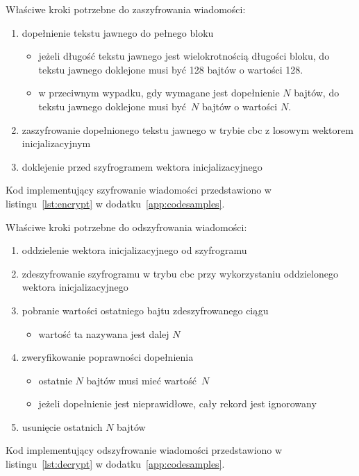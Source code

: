 Właściwe kroki potrzebne do zaszyfrowania wiadomości:

\begin{enumerate}
\item dopełnienie tekstu jawnego do pełnego bloku
\begin{itemize}
\item jeżeli długość tekstu jawnego jest wielokrotnością długości bloku, do tekstu jawnego doklejone musi być 128 bajtów o wartości 128.
\item w przeciwnym wypadku, gdy wymagane jest dopełnienie $ N $ bajtów, do tekstu jawnego doklejone musi być $ N $ bajtów o wartości $ N $.
\end{itemize}
\item zaszyfrowanie dopełnionego tekstu jawnego w trybie \gls{cbc} z losowym wektorem inicjalizacyjnym
\item doklejenie przed szyfrogramem wektora inicjalizacyjnego
\end{enumerate}

Kod implementujący szyfrowanie wiadomości przedstawiono w listingu~\ref{lst:encrypt} w dodatku~\ref{app:codesamples}.

Właściwe kroki potrzebne do odszyfrowania wiadomości:

\begin{enumerate}
\item oddzielenie wektora inicjalizacyjnego od szyfrogramu
\item zdeszyfrowanie szyfrogramu w trybu \gls{cbc} przy wykorzystaniu oddzielonego wektora inicjalizacyjnego
\item pobranie wartości ostatniego bajtu zdeszyfrowanego ciągu
\begin{itemize}
    \item wartość ta nazywana jest dalej $ N $
\end{itemize}
\item zweryfikowanie poprawności dopełnienia
\begin{itemize}
\item ostatnie $ N $ bajtów musi mieć wartość $ N $
\item jeżeli dopełnienie jest nieprawidłowe, cały rekord jest ignorowany
\end{itemize}
\item usunięcie ostatnich $ N $ bajtów
\end{enumerate}

Kod implementujący odszyfrowanie wiadomości przedstawiono w listingu~\ref{lst:decrypt} w dodatku~\ref{app:codesamples}.


